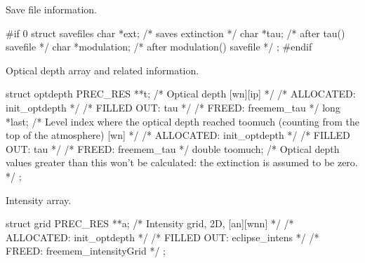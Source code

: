 \documentclass[letterpaper,12pt]{article}
\begin{document}
\noindent \newline
Save file information.
\begin{plain}
#if 0
struct savefiles {
  char *ext;         /* saves extinction            */
  char *tau;  	     /* after tau() savefile        */
  char *modulation;  /* after modulation() savefile */
};
#endif
\end{plain}

\noindent \newline
Optical depth array and related information.
\begin{plain}
struct optdepth{
  PREC_RES **t;     /* Optical depth [wn][ip]                               */
    /* ALLOCATED:       init_optdepth					    */
    /* FILLED OUT:      tau						    */
    /* FREED:           freemem_tau					    */
  long *last;       /*  Level index where the optical depth reached toomuch
                       (counting from the top of the atmosphere) [wn]       */
    /* ALLOCATED:       init_optdepth                                       */
    /* FILLED OUT:      tau						    */
    /* FREED:           freemem_tau					    */
  double toomuch;   /* Optical depth values greater than this won't be
                       calculated: the extinction is assumed to be zero.    */
};
\end{plain}

\noindent
Intensity array.
\begin{plain}
struct grid{
  PREC_RES **a;      /* Intensity grid, 2D, [an][wnn]                       */
    /* ALLOCATED:	init_optdepth					    */
    /* FILLED OUT:	eclipse_intens					    */
    /* FREED: 		freemem_intensityGrid				    */ 
};
\end{plain}
\end{document}
